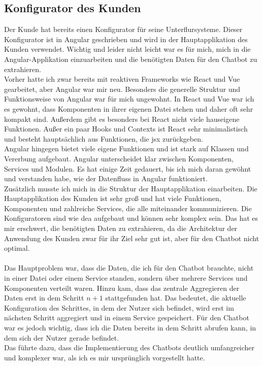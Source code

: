 \subsection{Konfigurator des Kunden}\label{sec:umsetzung_konfigurator}
Der Kunde hat bereits einen Konfigurator für seine Unterflursysteme. Dieser Konfigurator ist in Angular geschrieben und wird in der Hauptapplikation des Kunden verwendet.  
Wichtig und leider nicht leicht war es für mich, mich in die Angular-Applikation einzuarbeiten und die benötigten Daten für den Chatbot zu extrahieren.\\  
Vorher hatte ich zwar bereits mit reaktiven Frameworks wie React und Vue gearbeitet, aber Angular war mir neu. Besonders die generelle Struktur und Funktionsweise von Angular war für mich ungewohnt.  
In React und Vue war ich es gewohnt, dass Komponenten in ihrer eigenen Datei stehen und daher oft sehr kompakt sind. Außerdem gibt es besonders bei React nicht viele  
hauseigene Funktionen. Außer ein paar Hooks und Contexts ist React sehr minimalistisch und besteht hauptsächlich aus Funktionen, die \gls{jsx} zurückgeben.\\  
Angular hingegen bietet viele eigene Funktionen und ist stark auf Klassen und Vererbung aufgebaut. Angular unterscheidet klar zwischen Komponenten, Services und Modulen.  
Es hat einige Zeit gedauert, bis ich mich daran gewöhnt und verstanden habe, wie der Datenfluss in Angular funktioniert.\\  
Zusätzlich musste ich mich in die Struktur der Hauptapplikation einarbeiten. Die Hauptapplikation des Kunden ist sehr groß und hat viele Funktionen, Komponenten und zahlreiche  
Services, die alle miteinander kommunizieren. Die Konfiguratoren sind wie \gls{dea} aufgebaut und können sehr komplex sein. Das hat es mir erschwert, die benötigten Daten zu extrahieren,  
da die Architektur der Anwendung des Kunden zwar für ihr Ziel sehr gut ist, aber für den Chatbot nicht optimal.\\\\  
Das Hauptproblem war, dass die Daten, die ich für den Chatbot brauchte, nicht in einer Datei oder einem Service standen, sondern über mehrere Services und Komponenten verteilt waren.  
Hinzu kam, dass das zentrale Aggregieren der Daten erst in dem Schritt $n+1$ stattgefunden hat.  
Das bedeutet, die aktuelle Konfiguration des Schrittes, in dem der Nutzer sich befindet, wird erst im nächsten Schritt aggregiert und in einem Service gespeichert.  
Für den Chatbot war es jedoch wichtig, dass ich die Daten bereits in dem Schritt abrufen kann, in dem sich der Nutzer gerade befindet.\\  
Das führte dazu, dass die Implementierung des Chatbots deutlich umfangreicher und komplexer war, als ich es mir ursprünglich vorgestellt hatte.

